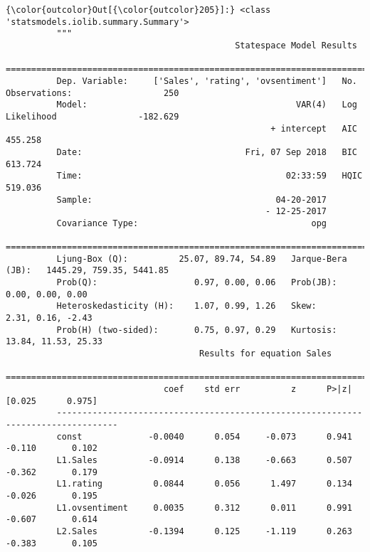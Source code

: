 \documentclass[11pt]{article}
\begin{document}
\begin{Verbatim}[commandchars=\\\{\}]
{\color{outcolor}Out[{\color{outcolor}205}]:} <class 'statsmodels.iolib.summary.Summary'>
          """
                                             Statespace Model Results                                   
          ==============================================================================================
          Dep. Variable:     ['Sales', 'rating', 'ovsentiment']   No. Observations:                  250
          Model:                                         VAR(4)   Log Likelihood                -182.629
                                                    + intercept   AIC                            455.258
          Date:                                Fri, 07 Sep 2018   BIC                            613.724
          Time:                                        02:33:59   HQIC                           519.036
          Sample:                                    04-20-2017                                         
                                                   - 12-25-2017                                         
          Covariance Type:                                  opg                                         
          ==========================================================================================
          Ljung-Box (Q):          25.07, 89.74, 54.89   Jarque-Bera (JB):   1445.29, 759.35, 5441.85
          Prob(Q):                   0.97, 0.00, 0.06   Prob(JB):                   0.00, 0.00, 0.00
          Heteroskedasticity (H):    1.07, 0.99, 1.26   Skew:                      2.31, 0.16, -2.43
          Prob(H) (two-sided):       0.75, 0.97, 0.29   Kurtosis:                13.84, 11.53, 25.33
                                      Results for equation Sales                            
          ==================================================================================
                               coef    std err          z      P>|z|      [0.025      0.975]
          ----------------------------------------------------------------------------------
          const             -0.0040      0.054     -0.073      0.941      -0.110       0.102
          L1.Sales          -0.0914      0.138     -0.663      0.507      -0.362       0.179
          L1.rating          0.0844      0.056      1.497      0.134      -0.026       0.195
          L1.ovsentiment     0.0035      0.312      0.011      0.991      -0.607       0.614
          L2.Sales          -0.1394      0.125     -1.119      0.263      -0.383       0.105

\end{Verbatim}
\end{document}
